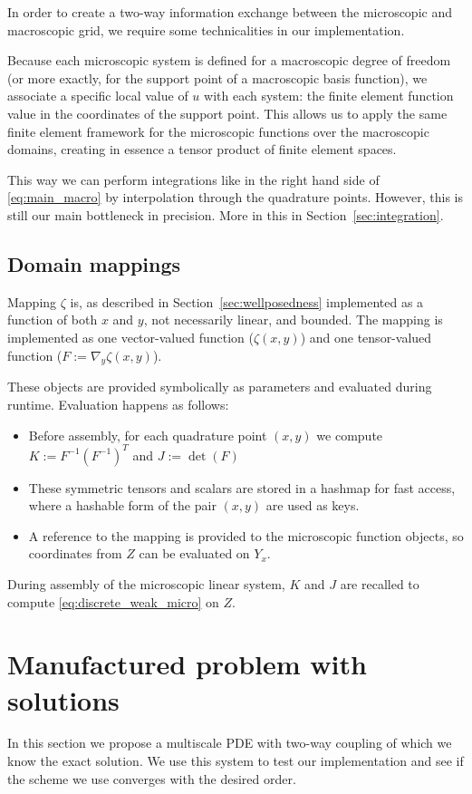 \documentclass{article}
\begin{document}
In order to create a two-way information exchange between the microscopic and macroscopic grid, we require some technicalities in our implementation.

Because each microscopic system is defined for a macroscopic degree of freedom (or more exactly, for the support point of a macroscopic basis function), we associate a specific local value of $u$ with each system: the finite element function value in the coordinates of the support point.
This allows us to apply the same finite element framework for the microscopic functions over the macroscopic domains, creating in essence a tensor product of finite element spaces.

This way we can perform integrations like in the right hand side of \eqref{eq:main_macro} by interpolation through the quadrature points. However, this is still our main bottleneck in precision. More in this in Section~\ref{sec:integration}.

\subsection{Domain mappings}
\label{sec:mapping}
Mapping $\zeta$ is, as described in Section~\ref{sec:wellposedness} implemented as a function of both $x$ and $y$, not necessarily linear, and bounded. The mapping is implemented as one vector-valued function ($\zeta(x,y)$) and one tensor-valued function ($F:=\nabla_y \zeta(x,y)$).

These objects are provided symbolically as parameters and evaluated during runtime.
Evaluation happens as follows:
\begin{itemize}
    \item Before assembly, for each quadrature point $(x,y)$ we compute $K := F^{-1} \left(F^{-1}\right)^{T}$ and $J := \det \left(F \right)$
    \item These symmetric tensors and scalars are stored in a hashmap for fast access, where a hashable form of the pair $(x,y)$ are used as keys.
    \item A reference to the mapping is provided to the microscopic function objects, so coordinates from $Z$ can be evaluated on $Y_x$.
\end{itemize}

During assembly of the microscopic linear system, $K$ and $J$ are recalled to compute \eqref{eq:discrete_weak_micro} on $Z$.
\section{Manufactured problem with solutions}
\label{sec:manufactured}
In this section we propose a multiscale PDE with two-way coupling of which we know the exact solution. We use this system to test our implementation and see if the scheme we use converges with the desired order.
\end{document}
